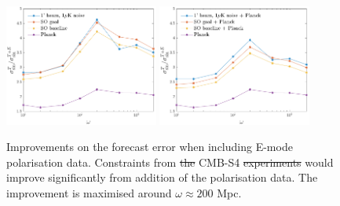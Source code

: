 \documentclass[a4paper,12pt,times,custombib,print,index]{Classes/PhDThesisPSnPDF} %
\providecommand{\DIFdel}[1]{{\protect\color{red}\sout{#1}}}                      %
\providecommand{\DIFdelFL}[1]{\DIFdel{#1}} %
\providecommand{\DIFdelbeginFL}{} %
\providecommand{\DIFdelendFL}{} %
\newcommand{\DIFscaledelfig}{0.5}
\newlength{\DIFdelgraphicswidth} %
\newlength{\DIFdelgraphicsheight} %
\newcommand{\DIFdelincludegraphics}[2][]{%
\sbox{\DIFdelgraphicsbox}{\DIFOincludegraphics[#1]{#2}}%
\settoboxwidth{\DIFdelgraphicswidth}{\DIFdelgraphicsbox} %
\settoboxtotalheight{\DIFdelgraphicsheight}{\DIFdelgraphicsbox} %
\scalebox{\DIFscaledelfig}{%
\parbox[b]{\DIFdelgraphicswidth}{\usebox{\DIFdelgraphicsbox}\\[-\baselineskip] \rule{\DIFdelgraphicswidth}{0em}}\llap{\resizebox{\DIFdelgraphicswidth}{\DIFdelgraphicsheight}{%
\setlength{\unitlength}{\DIFdelgraphicswidth}%
\begin{picture}(1,1)%
\thicklines\linethickness{2pt} %
{\color[rgb]{1,0,0}\put(0,0){\framebox(1,1){}}}%
{\color[rgb]{1,0,0}\put(0,0){\line( 1,1){1}}}%
{\color[rgb]{1,0,0}\put(0,1){\line(1,-1){1}}}%
\end{picture}%
}\hspace*{3pt}}} %
} %
\DeclareRobustCommand{\DIFdelbeginFL}{\DIFOdelbeginFL \let\includegraphics\DIFdelincludegraphics} %
\DeclareRobustCommand{\DIFdelendFL}{\DIFOaddendFL \let\includegraphics\DIFOincludegraphics} %
\begin{document}
\begin{figure}[ht]
	\centering
	\includegraphics[width=0.45\textwidth]{improvement_ratio.pdf}
	\includegraphics[width=0.45\textwidth]{improvement_ratio_combined.pdf}
	\caption{Improvements on the forecast error when including E-mode polarisation data. Constraints from \DIFdelbeginFL \DIFdelFL{the }\DIFdelendFL CMB-S4 \DIFdelbeginFL \DIFdelFL{experiments }\DIFdelendFL would improve significantly from addition of the polarisation data. The improvement is maximised around $\omega\approx200$ Mpc.}
	\label{forecast improvement ratio}
\end{figure}
\end{document}
